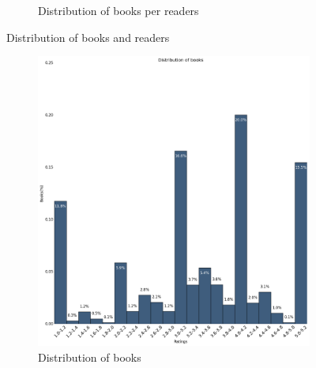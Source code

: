 \documentclass[11pt]{article}
\begin{document}
\begin{figure}
\begin{subfigure}[b]{0.5\textwidth}
                \caption{Distribution of books per readers}
                \label{fig:books_books_read}
        \end{subfigure}
        \caption{Distribution of books and readers}
\end{figure}





\begin{figure}
        \centering
        \begin{subfigure}[b]{0.4\textwidth}
                \includegraphics[width=\textwidth]{images/books_ratings}
                \caption{Distribution of books}
        \end{subfigure}%
        ~ %
        \begin{subfigure}[b]{0.4\textwidth}

\end{subfigure}
\end{figure}
\end{document}
